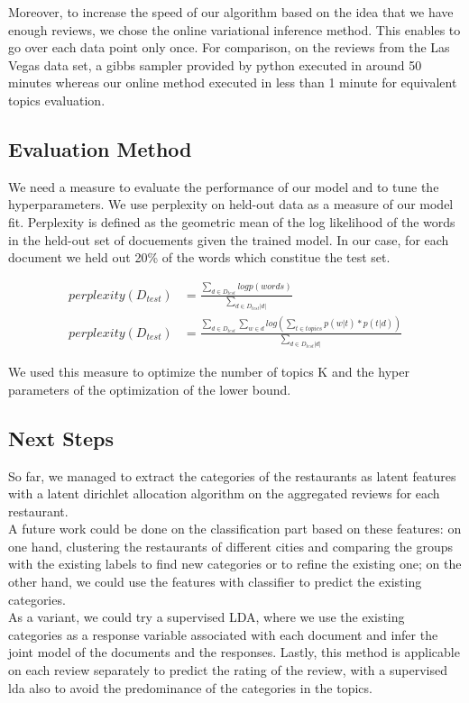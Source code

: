 \documentclass[paper=a4, fontsize=11pt]{scrartcl} %
\numberwithin{equation}{section}
\numberwithin{figure}{section}
\numberwithin{table}{section}
\begin{document}
Moreover, to increase the speed of our algorithm based on the idea that we have enough reviews, we chose the online variational inference method. This enables to go over each data point only once. For comparison, on the reviews from the Las Vegas data set, a gibbs sampler provided by python executed in around 50 minutes whereas our online method executed in less than 1 minute for equivalent topics evaluation.

\subsection*{Evaluation Method}

We need a measure to evaluate the performance of our model and to tune the hyperparameters. We use perplexity on held-out data as a measure of our model fit. Perplexity is defined as the geometric mean of the log likelihood of the words in the held-out set of docuements given the trained model. In our case, for each document we held out 20\% of the words which constitue the test set.

\begin{align*}
	perplexity(D_{test}) & = \frac{\sum_{d \in D_{test}} log p(words)}{\sum_{d \in D_{test}|d|}}\\
	perplexity(D_{test}) & = \frac{\sum_{d \in D_{test}} \sum_{w \in d} log \left( \sum_{t \in topics} p(w|t) * p(t|d) \right)}{\sum_{d \in D_{test}|d|}}
\end{align*}

We used this measure to optimize the number of topics K and the hyper parameters of the optimization of the lower bound.

\subsection*{Next Steps}

So far, we managed to extract the categories of the restaurants as latent features with a latent dirichlet allocation algorithm on the aggregated reviews for each restaurant. \\

A future work could be done on the classification part based on these features: on one hand, clustering the restaurants of different cities and comparing the groups with the existing labels to find new categories or to refine the existing one; on the other hand, we could use the features with classifier to predict the existing categories. \\

As a variant, we could try a supervised LDA, where we use the existing categories as a response variable associated with each document and infer the joint model of the documents and the responses. Lastly, this method is applicable on each review separately to predict the rating of the review, with a supervised lda also to avoid the predominance of the categories in the topics.
\end{document}
